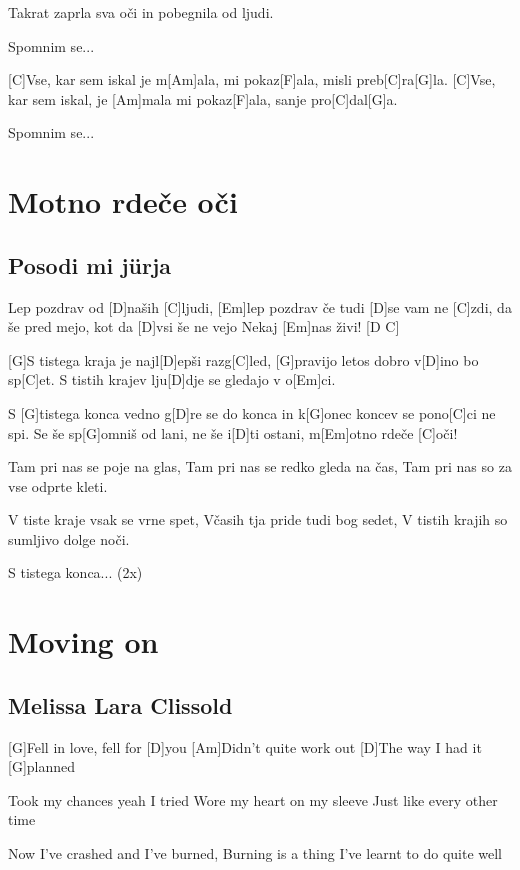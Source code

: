 \documentclass[a4paper,12pt]{article}
\begin{document}
\begin{multicols}{2}
\begin{guitar}
Takrat zaprla sva oči
in pobegnila od ljudi.


Spomnim se...


[C]Vse, kar sem iskal je m[Am]ala,
mi pokaz[F]ala, misli preb[C]ra[G]la.
[C]Vse, kar sem iskal, je [Am]mala
mi pokaz[F]ala, sanje pro[C]dal[G]a.

Spomnim se...

\end{guitar}
\section{Motno rdeče oči}
\subsection*{Posodi mi jürja}
\begin{guitar}
[Em]Lep pozdrav od [D]naših [C]ljudi,
[Em]lep pozdrav če tudi [D]se vam ne [C]zdi,
da še pred mejo, kot da [D]vsi še ne vejo
Nekaj [Em]nas živi! [D C]


[G]S tistega kraja je najl[D]epši razg[C]led,
[G]pravijo letos dobro v[D]ino bo sp[C]et.
S tistih krajev lju[D]dje se gledajo v o[Em]ci.


S [G]tistega konca vedno g[D]re se do konca
in k[G]onec koncev se pono[C]ci ne spi.
Se še sp[G]omniš od lani, ne še i[D]ti ostani,
m[Em]otno rdeče [C]oči!

 Tam pri nas se poje na glas,
Tam pri nas se redko gleda na čas,
Tam pri nas so za vse odprte kleti.

V tiste kraje vsak se vrne spet,
Včasih tja pride tudi bog sedet,
V tistih krajih so sumljivo dolge noči.

S tistega konca... (2x)

\end{guitar}
\section{Moving on}
\subsection*{Melissa Lara Clissold}
\begin{guitar}
[G D Am D G]

[G]Fell in love, fell for [D]you
[Am]Didn't quite work out
[D]The way I had it [G]planned

Took my chances yeah I tried
Wore my heart on my sleeve
Just like every other time

Now I've crashed and I've burned,
Burning is a thing
I've learnt to do quite well


\end{guitar}
\end{multicols}
\end{document}
